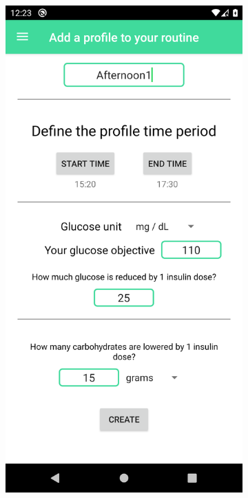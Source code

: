 \begin{figure}[H]
    \captionsetup[subfigure]{justification=centering}
    \begin{center}
        \begin{subfigure}{.3\textwidth}
            \includegraphics[scale=0.1, width=\textwidth]{_figures/addProfile.png}

\end{subfigure}
\end{center}
\end{figure}
